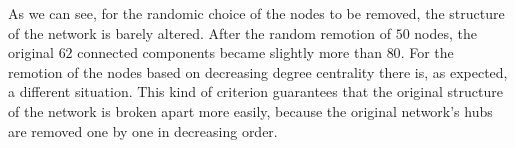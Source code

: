         As we can see, for the randomic choice of the nodes to be removed, the structure of the network is barely
        altered. After the random remotion of $50$ nodes, the original $62$ connected components became slightly
        more than $80$. For the remotion of the nodes based on decreasing degree centrality there is, as expected,
        a different situation. This kind of criterion guarantees that the original structure of the network is
        broken apart more easily, because the original network's hubs are removed one by one in decreasing order.
